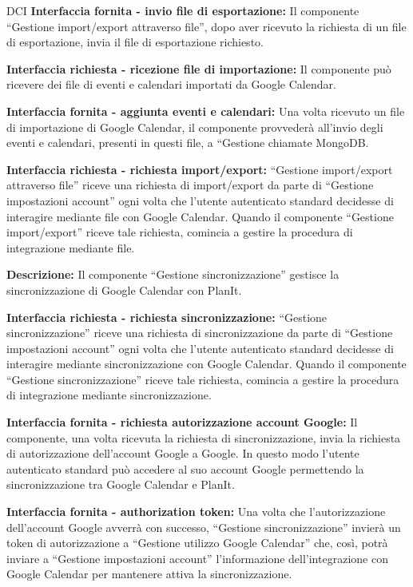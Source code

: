 \begin{listaPersonale}{DCI}
    \textbf{Interfaccia fornita - invio file di esportazione:} Il componente “Gestione import/export attraverso file”, dopo aver ricevuto la richiesta di un file di esportazione, invia il file di esportazione richiesto.

    \textbf{Interfaccia richiesta - ricezione file di importazione:} Il componente può ricevere dei file di eventi e calendari importati da Google Calendar.

    \textbf{Interfaccia fornita - aggiunta eventi e calendari:} Una volta ricevuto un file di importazione di Google Calendar, il componente provvederà all'invio degli eventi e calendari, presenti in questi file, a “Gestione chiamate MongoDB.

    \textbf{Interfaccia richiesta - richiesta import/export:} “Gestione import/export attraverso file” riceve una richiesta di import/export da parte di “Gestione impostazioni account” ogni volta che l'utente autenticato standard decidesse di interagire mediante file con Google Calendar. Quando il componente “Gestione import/export” riceve tale richiesta, comincia a gestire la procedura di integrazione mediante file.



    \textbf{Descrizione:}   Il componente “Gestione sincronizzazione” gestisce la sincronizzazione di Google Calendar con PlanIt.

    \textbf{Interfaccia richiesta - richiesta sincronizzazione:} “Gestione sincronizzazione” riceve una richiesta di sincronizzazione da parte di “Gestione impostazioni account” ogni volta che l'utente autenticato standard decidesse di interagire mediante sincronizzazione con Google Calendar. Quando il componente “Gestione sincronizzazione” riceve tale richiesta, comincia a gestire la procedura di integrazione mediante sincronizzazione.

    \textbf{Interfaccia fornita - richiesta autorizzazione account Google:} Il componente, una volta ricevuta la richiesta di sincronizzazione, invia la richiesta di autorizzazione dell'account Google a Google. In questo modo l'utente autenticato standard può accedere al suo account Google permettendo la sincronizzazione tra Google Calendar e PlanIt.

    \textbf{Interfaccia fornita - authorization token:} Una volta che l'autorizzazione dell'account Google avverrà con successo, “Gestione sincronizzazione” invierà un token di autorizzazione a “Gestione utilizzo Google Calendar” che, così, potrà inviare a “Gestione impostazioni account” l'informazione dell'integrazione con Google Calendar per mantenere attiva la sincronizzazione.



\end{listaPersonale}
